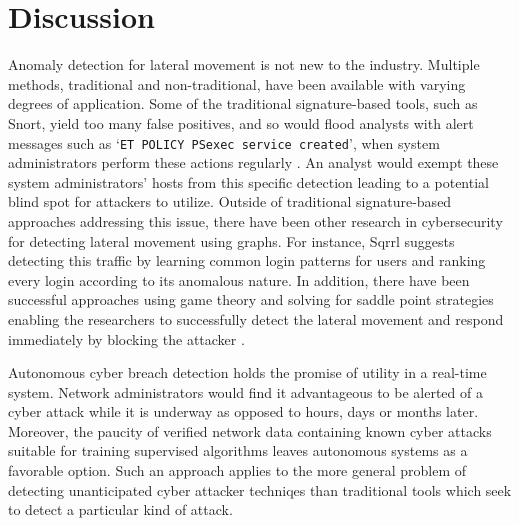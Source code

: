 \documentclass[sigconf]{acmart}
\begin{document}


\section{Discussion}
Anomaly detection for lateral movement is not new to the industry. Multiple methods, traditional and non-traditional, have been available with varying degrees of application.  %
Some of the traditional signature-based tools, such as Snort, yield too many false positives, and so would flood analysts with alert messages such as `\texttt{ET POLICY PSexec service created}', when system administrators perform these actions
regularly \cite{CYRUS}. An analyst would exempt these system administrators' hosts from this specific detection leading to a potential blind spot for attackers to utilize.  Outside of traditional signature-based approaches addressing this issue, there have been other research in cybersecurity for detecting lateral movement using graphs. For instance, Sqrrl suggests detecting this traffic by learning common login patterns for users and ranking every login according to its anomalous nature\cite{SQRRL}.  In addition, there have been successful approaches using game theory and solving for saddle point strategies enabling the researchers to successfully detect the lateral movement and respond immediately by blocking the attacker \cite{FAWAZ}.

Autonomous cyber breach detection holds the promise of utility in a real-time system.  Network administrators would find it advantageous to be alerted of a cyber attack while it is underway as opposed to hours, days or months later.  Moreover, the paucity of verified network data
containing known cyber attacks suitable for training supervised algorithms leaves autonomous systems as a favorable option.  Such an approach applies to the more general problem of detecting unanticipated cyber attacker techniqes than traditional tools which seek to detect a particular kind of attack.
\end{document}
